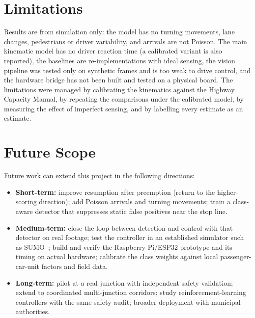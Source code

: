 \section{Limitations}
Results are from simulation only: the model has no turning movements, lane changes, pedestrians or driver variability, and arrivals are not Poisson. The main kinematic model has no driver reaction time (a calibrated variant is also reported), the baselines are re-implementations with ideal sensing, the vision pipeline was tested only on synthetic frames and is too weak to drive control, and the hardware bridge has not been built and tested on a physical board. The limitations were managed by calibrating the kinematics against the Highway Capacity Manual, by repeating the comparisons under the calibrated model, by measuring the effect of imperfect sensing, and by labelling every estimate as an estimate.

\section{Future Scope}
\label{sec:future}
Future work can extend this project in the following directions:
\begin{itemize}
  \item \textbf{Short-term:} improve resumption after preemption (return to the higher-scoring direction); add Poisson arrivals and turning movements; train a class-aware detector that suppresses static false positives near the stop line.
  \item \textbf{Medium-term:} close the loop between detection and control with that detector on real footage; test the controller in an established simulator such as SUMO~\cite{ref22}; build and verify the Raspberry Pi/ESP32 prototype and its timing on actual hardware; calibrate the class weights against local passenger-car-unit factors and field data.
  \item \textbf{Long-term:} pilot at a real junction with independent safety validation; extend to coordinated multi-junction corridors; study reinforcement-learning controllers with the same safety audit; broader deployment with municipal authorities.
\end{itemize}
